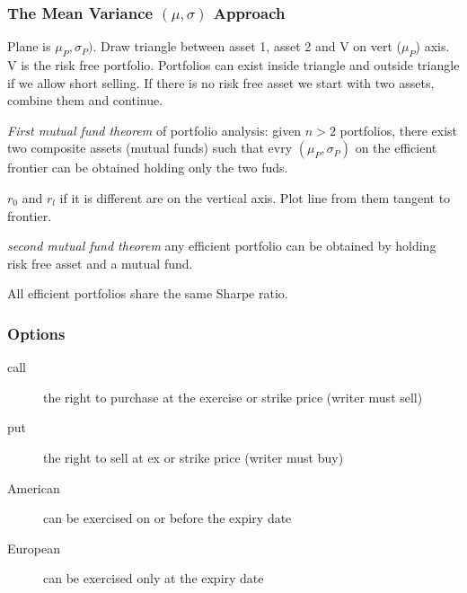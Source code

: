 \subsubsection*{The Mean Variance $(\mu,\sigma)$ Approach}
Plane is $\mu_P,\sigma_P)$. Draw triangle between asset 1, asset 2 and V on
vert ($\mu_P$) axis. V is the risk free portfolio. Portfolios can exist inside
triangle and outside triangle if we allow short selling. If there is no risk
free asset we start with two assets, combine them and continue.

\emph{First mutual fund theorem} of portfolio analysis: given $n>2$ portfolios,
there exist two composite assets (mutual funds) such that evry
$(\mu_P,\sigma_P)$ on the efficient frontier can be obtained holding only the
two fuds.

$r_0$ and $r_l$ if it is different are on the vertical axis. Plot line from
them tangent to frontier.

\emph{second mutual fund theorem} any efficient portfolio can be obtained by
holding risk free asset and a mutual fund.

All efficient portfolios share the same Sharpe ratio.

%
%
%
%
%
\subsubsection*{Options}
\begin{description}
\item[call] the right to purchase at the exercise or strike price (writer must
sell)
\item[put] the right to sell at ex or strike price (writer must buy)
\item[American] can be exercised on or before the expiry date
\item[European] can be exercised only at the expiry date
\end{description}

\clearpage

